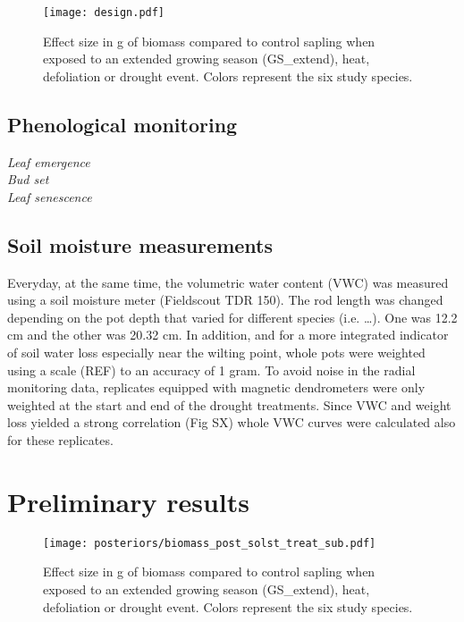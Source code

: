 \documentclass{article}
\begin{document}
	
	
	
		\begin{figure}[H]
		\centering
		\texttt{[image: design.pdf]} 
		\caption{Effect size in g of biomass compared to control sapling when exposed to an extended growing season (GS\_extend), heat, defoliation or drought event. Colors represent the six study species. }
		\label{fig:fig_1xxx}
	\end{figure}
	
	\subsection*{Phenological monitoring}
		\textit{Leaf emergence} \\
	
		\textit{Bud set} \\
		
		\textit{Leaf senescence} \\
			
			
	\subsection*{Soil moisture measurements}
Everyday, at the same time, the volumetric water content (VWC) was measured using a soil moisture meter (Fieldscout TDR 150). The rod length was changed depending on the pot depth that varied for different species (i.e. …). One was 12.2 cm and the other was 20.32 cm. In addition, and for a more integrated indicator of soil water loss especially near the wilting point, whole pots were weighted using a scale (REF) to an accuracy of 1 gram. To avoid noise in the radial monitoring data, replicates equipped with magnetic dendrometers were only weighted at the start and end of the drought treatments. Since VWC and weight loss yielded a strong correlation (Fig SX) whole VWC curves were calculated also for these replicates.

	
	\section*{Preliminary results}
	
	
	\begin{figure}
	\centering
	\texttt{[image: posteriors/biomass\_post\_solst\_treat\_sub.pdf]} 
	\caption{Effect size in g of biomass compared to control sapling when exposed to an extended growing season (GS\_extend), heat, defoliation or drought event. Colors represent the six study species. }
	\label{fig:fig_1xxx}
\end{figure}
	
\end{document}
